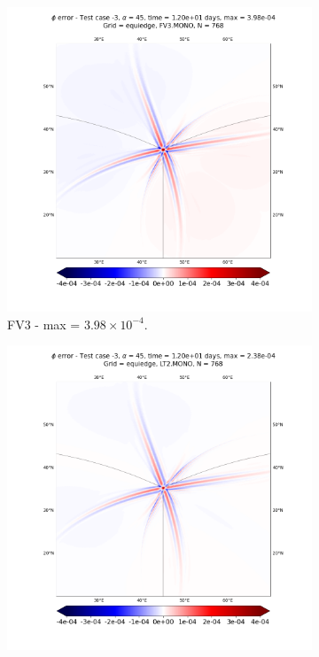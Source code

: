 \documentclass[preprint,12pt]{elsarticle}
\begin{document}
\begin{linenumbers}
\begin{figure}[!htb]
	\centering
	\begin{subfigure}{0.45\textwidth}
		\centering
		\includegraphics[width=1.1\linewidth]{h_error_tc-3_t12_alpha45_C768_g0_dg2_adv1_hord8_mf1_tf12}
		\caption{FV3 - max = $3.98 \times 10^{-4}$.\label{GH-FV3-corner}}
	\end{subfigure}
	\begin{subfigure}{0.45\textwidth}
		\centering
		\includegraphics[width=1.1\linewidth]{h_error_tc-3_t12_alpha45_C768_g0_dg2_adv2_hord8_mf1_tf12}

\end{subfigure}
\end{figure}
\end{linenumbers}
\end{document}
